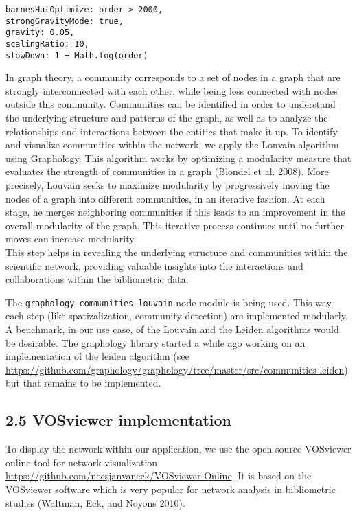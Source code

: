 \documentclass[
]{article}
\begin{document}
\begin{verbatim}
barnesHutOptimize: order > 2000,
strongGravityMode: true,
gravity: 0.05,
scalingRatio: 10,
slowDown: 1 + Math.log(order)
\end{verbatim}

In graph theory, a community corresponds to a set of nodes in a graph
that are strongly interconnected with each other, while being less
connected with nodes outside this community. Communities can be
identified in order to understand the underlying structure and patterns
of the graph, as well as to analyze the relationships and interactions
between the entities that make it up. To identify and visualize
communities within the network, we apply the Louvain algorithm using
Graphology. This algorithm works by optimizing a modularity measure that
evaluates the strength of communities in a graph (Blondel et al. 2008).
More precisely, Louvain seeks to maximize modularity by progressively
moving the nodes of a graph into different communities, in an iterative
fashion. At each stage, he merges neighboring communities if this leads
to an improvement in the overall modularity of the graph. This iterative
process continues until no further moves can increase modularity.\\
This step helps in revealing the underlying structure and communities
within the scientific network, providing valuable insights into the
interactions and collaborations within the bibliometric data.

The \texttt{graphology-communities-louvain} node module is being used.
This way, each step (like spatizalization, community-detection) are
implemented modularly. A benchmark, in our use case, of the Louvain and
the Leiden algorithms would be desirable. The graphology library started
a while ago working on an implementation of the leiden algorithm (see
\url{https://github.com/graphology/graphology/tree/master/src/communities-leiden})
but that remains to be implemented.

\hypertarget{vosviewer-implementation}{%
\subsection{2.5 VOSviewer
implementation}\label{vosviewer-implementation}}

To display the network within our application, we use the open source
VOSviewer online tool for network visualization
\url{https://github.com/neesjanvaneck/VOSviewer-Online}. It is based on
the VOSviewer software which is very popular for network analysis in
bibliometric studies (Waltman, Eck, and Noyons 2010).
\end{document}
